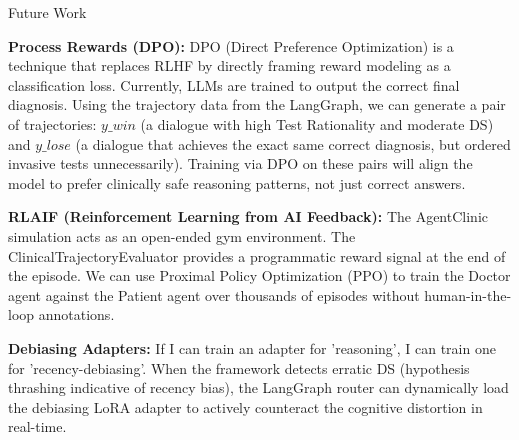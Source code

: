 \documentclass[aspectratio=169,11pt]{beamer}
\begin{document}
\begin{frame}{Future Work}
{\textbf{Process Rewards (DPO):} DPO (Direct Preference Optimization) is a technique that replaces RLHF by directly framing reward modeling as a classification loss. Currently, LLMs are trained to output the correct final diagnosis. Using the trajectory data from the LangGraph, we can generate a pair of trajectories: $y\_win$ (a dialogue with high Test Rationality and moderate DS) and $y\_lose$ (a dialogue that achieves the exact same correct diagnosis, but ordered invasive tests unnecessarily). Training via DPO on these pairs will align the model to prefer clinically safe reasoning patterns, not just correct answers.

\textbf{RLAIF (Reinforcement Learning from AI Feedback):} The AgentClinic simulation acts as an open-ended gym environment. The ClinicalTrajectoryEvaluator provides a programmatic reward signal at the end of the episode. We can use Proximal Policy Optimization (PPO) to train the Doctor agent against the Patient agent over thousands of episodes without human-in-the-loop annotations.

\textbf{Debiasing Adapters:} If I can train an adapter for 'reasoning', I can train one for 'recency-debiasing'. When the framework detects erratic DS (hypothesis thrashing indicative of recency bias), the LangGraph router can dynamically load the debiasing LoRA adapter to actively counteract the cognitive distortion in real-time.
}
\end{frame}
\end{document}
